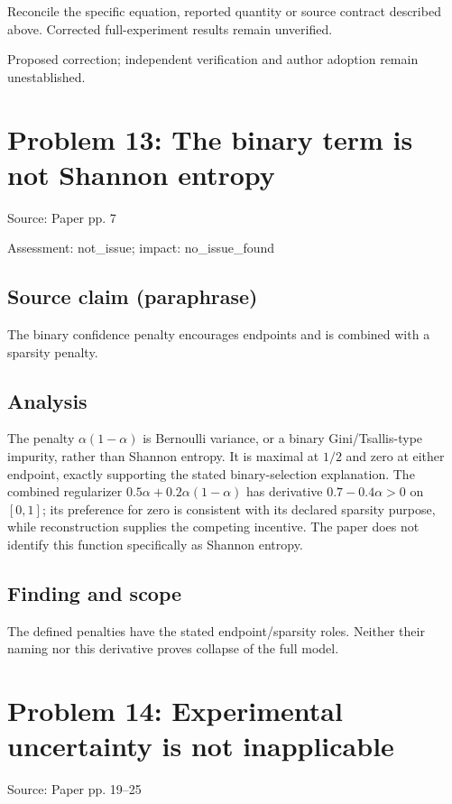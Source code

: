 \documentclass[11pt]{article}
\begin{document}
Reconcile the specific equation, reported quantity or source contract described above. Corrected full-experiment results remain unverified.

Proposed correction; independent verification and author adoption remain unestablished.

\section*{Problem 13: The binary term is not Shannon entropy}

Source: Paper pp. 7

Assessment: not\_issue; impact: no\_issue\_found

\subsection*{Source claim (paraphrase)}

The binary confidence penalty encourages endpoints and is combined with a sparsity penalty.

\subsection*{Analysis}

The penalty \(\alpha(1-\alpha)\) is Bernoulli variance, or a binary Gini/Tsallis-type impurity, rather than Shannon entropy. It is maximal at \(1/2\) and zero at either endpoint, exactly supporting the stated binary-selection explanation. The combined regularizer \(0.5\alpha+0.2\alpha(1-\alpha)\) has derivative \(0.7-0.4\alpha>0\) on \([0,1]\); its preference for zero is consistent with its declared sparsity purpose, while reconstruction supplies the competing incentive. The paper does not identify this function specifically as Shannon entropy.

\subsection*{Finding and scope}

The defined penalties have the stated endpoint/sparsity roles. Neither their naming nor this derivative proves collapse of the full model.

\section*{Problem 14: Experimental uncertainty is not inapplicable}

Source: Paper pp. 19–25
\end{document}
